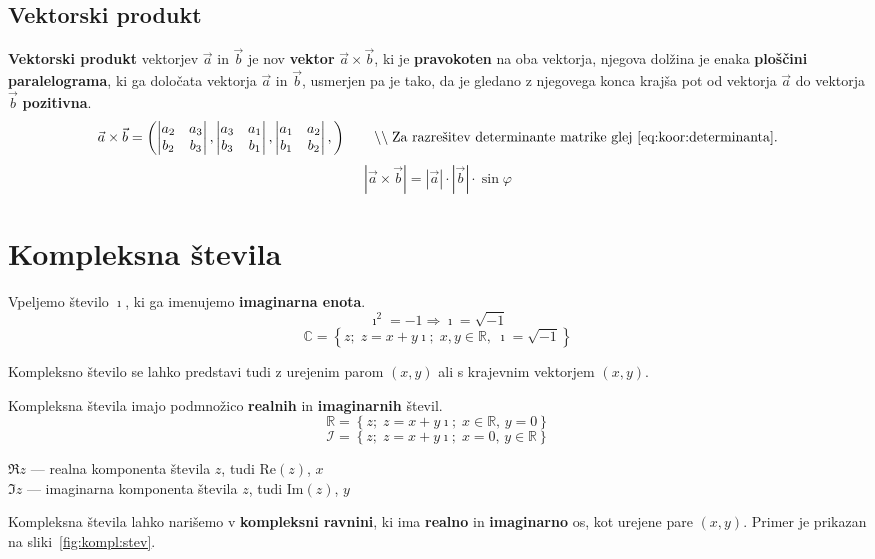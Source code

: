 \documentclass[a4paper,oneside,12pt,fleqn]{article}
\def\R{\ensuremath{\mathbb R}}
\def\C{\ensuremath{\mathbb C}}
\def\I{\ensuremath{\mathcal I}}
\newcommand\krat\cdot
\newcommand{\comment}[1]{\ensuremath{\qquad\backslash\backslash\;}\textnormal{#1}}
\newcommand{\ii}{\ensuremath{\imath}}
\renewcommand\implies\Rightarrow
\numberwithin{equation}{section}
\begin{document}
\subsection{Vektorski produkt}
\label{sec:vec:vec}
\textbf{Vektorski produkt} vektorjev $\vec{a}$ in $\vec{b}$ je nov \textbf{vektor} $\vec{a} \times \vec{b}$,
ki je  \textbf{pravokoten} na oba vektorja, njegova dolžina je enaka \textbf{ploščini paralelograma}, ki ga
določata vektorja $\vec{a}$ in $\vec{b}$, usmerjen pa je tako, da je gledano z njegovega
konca krajša pot od vektorja $\vec{a}$ do vektorja $\vec{b}$ \textbf{pozitivna}.
\[ \vec{a}\times\vec{b} = \left(
\begin{vmatrix} a_2 & a_3 \\ b_2 & b_3 \end{vmatrix},
\begin{vmatrix} a_3 & a_1 \\ b_3 & b_1 \end{vmatrix},
\begin{vmatrix} a_1 & a_2 \\ b_1 & b_2 \end{vmatrix},
\right) \comment{Za razrešitev determinante matrike glej~\eqref{eq:koor:determinanta}.} \]
\[ \left| \vec{a}\times\vec{b} \right| = |\vec{a}| \krat |\vec{b}| \krat\sin\varphi \]

\section{Kompleksna števila}
\label{sec:kompl}
Vpeljemo število $\ii$, ki ga imenujemo \textbf{imaginarna enota}.
\[\ii^2 = -1 \implies \ii = \sqrt{-1} \]
\[ \C = \left\{z; \; z=x+y\ii; \; x,y \in \R, \; \ii = \sqrt{-1} \right\} \]

Kompleksno število se lahko predstavi tudi z urejenim parom $(x,y)$ ali s krajevnim
vektorjem $(x,y)$.

Kompleksna števila imajo podmnožico \textbf{realnih} in \textbf{imaginarnih} števil.
\[ \R = \left\{ z; \; z = x+y\ii; \; x \in \R, \, y = 0 \right\} \]
\[ \I = \left\{ z; \; z = x+y\ii; \; x = 0, \, y \in \R \right\} \]

$\Re z$ --- realna komponenta števila $z$, tudi $\text{Re}(z)$, $x$ \\
$\Im z$ --- imaginarna komponenta števila $z$, tudi $\text{Im}(z)$, $y$

Kompleksna števila lahko narišemo v \textbf{kompleksni ravnini}, ki ima \textbf{realno} in
\textbf{imaginarno} os, kot urejene pare $(x,y)$. Primer je prikazan na sliki~\ref{fig:kompl:stev}.
\end{document}
